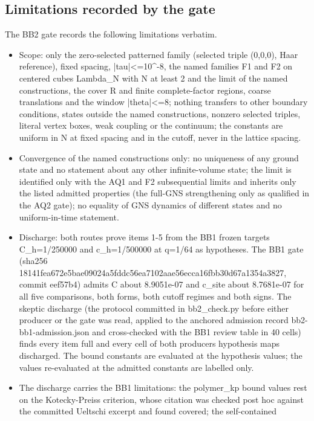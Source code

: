 \subsection{Limitations recorded by the gate}
\label{sec:bb2-limits}
The BB2 gate records the following limitations verbatim.
\begin{gatequote}
\begin{itemize}
\item Scope: only the zero-selected patterned family (selected triple (0,0,0),
Haar reference), fixed spacing, |tau|<=10\textasciicircum{}-8, the named
families F1 and F2 on centered cubes Lambda\_N with N at least 2 and the limit
of the named constructions, the cover R and finite complete-factor regions,
coarse translations and the window |theta|<=8; nothing transfers to other
boundary conditions, states outside the named constructions, nonzero selected
triples, literal vertex boxes, weak coupling or the continuum; the constants
are uniform in N at fixed spacing and in the cutoff, never in the lattice
spacing.
\item Convergence of the named constructions only: no uniqueness of any ground
state and no statement about any other infinite-volume state; the limit is
identified only with the AQ1 and F2 subsequential limits and inherits only the
listed admitted properties (the full-GNS strengthening only as qualified in
the AQ2 gate); no equality of GNS dynamics of different states and no
uniform-in-time statement.
\item Discharge: both routes prove items 1-5 from the BB1 frozen targets
C\_h=1/250000 and c\_h=1/500000 at q=1/64 as hypotheses. The BB1 gate (sha256
18141fea672e5bae09024a5fddc56ea7102aae56ecca16fbb30d67a1354a3827, commit
eef57b4) admits C about 8.9051e-07 and c\_site about 8.7681e-07 for all five
comparisons, both forms, both cutoff regimes and both signs. The skeptic
discharge (the protocol committed in bb2\_check.py before either producer or
the gate was read, applied to the anchored admission record
bb2-bb1-admission.json and cross-checked with the BB1 review table in 40
cells) finds every item full and every cell of both
producers\textquotesingle{} hypothesis maps discharged. The bound constants
are evaluated at the hypothesis values; the values re-evaluated at the
admitted constants are labelled only.
\item The discharge carries the BB1 limitations: the polymer\_kp bound values
rest on the Kotecky-Preiss criterion, whose citation was checked post hoc
against the committed Ueltschi excerpt and found covered; the self-contained

\end{itemize}
\end{gatequote}
